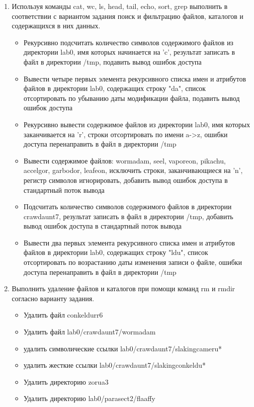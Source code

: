\begin{enumerate}
	\item Используя команды cat, wc, ls, head, tail, echo, sort, grep выполнить в соответствии с вариантом задания поиск и фильтрацию файлов, каталогов и содержащихся в них данных.
	\begin{itemize}
		\item Рекурсивно подсчитать количество символов содержимого файлов из директории lab0, имя которых начинается на 'c', результат записать в файл в директории /tmp, подавить вывод ошибок доступа
		\item Вывести четыре первых элемента рекурсивного списка имен и атрибутов файлов в директории lab0, содержащих строку "da", список отсортировать по убыванию даты модификации файла, подавить вывод ошибок доступа
		\item Рекурсивно вывести содержимое файлов из директории lab0, имя которых заканчивается на 'r', строки отсортировать по имени a->z, ошибки доступа перенаправить в файл в директории /tmp
		\item Вывести содержимое файлов: wormadam, seel, vaporeon, pikachu, accelgor, garbodor, leafeon, исключить строки, заканчивающиеся на 'n', регистр символов игнорировать, добавить вывод ошибок доступа в стандартный поток вывода
		\item Подсчитать количество символов содержимого файлов в директории crawdaunt7, результат записать в файл в директории /tmp, добавить вывод ошибок доступа в стандартный поток вывода
		\item Вывести два первых элемента рекурсивного списка имен и атрибутов файлов в директории lab0, содержащих строку "ldu", список отсортировать по возрастанию даты изменения записи о файле, ошибки доступа перенаправить в файл в директории /tmp
	\end{itemize}
	
	\item Выполнить удаление файлов и каталогов при помощи команд rm и rmdir согласно варианту задания.
	\begin{itemize}
		\item Удалить файл conkeldurr6
		\item Удалить файл lab0/crawdaunt7/wormadam
		\item удалить символические ссылки lab0/crawdaunt7/slakingcameru*
		\item удалить жесткие ссылки lab0/crawdaunt7/slakingconkeldu*
		\item Удалить директорию zorua3
		\item Удалить директорию lab0/parasect2/flaaffy
	\end{itemize}
\end{enumerate}